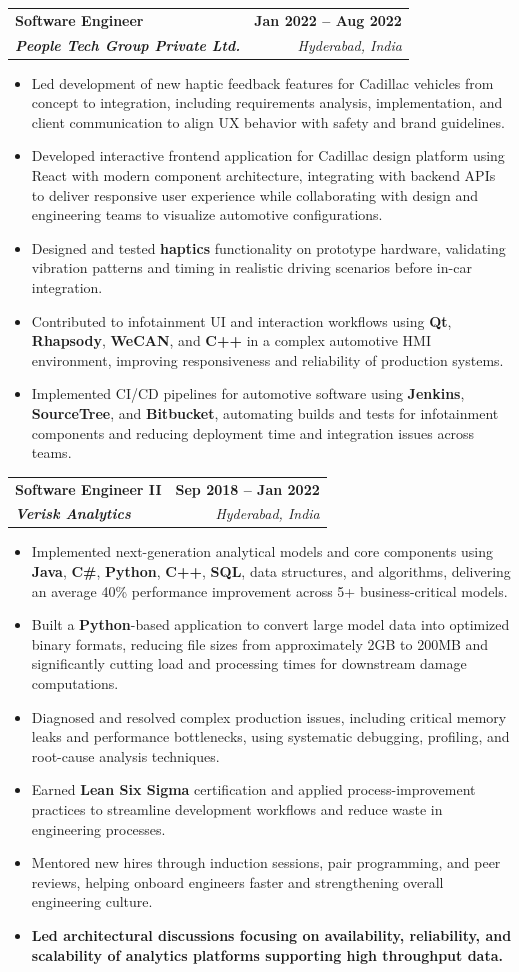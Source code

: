 \documentclass[letterpaper,11pt]{article}
\makeatletter
\newcommand{\resumeItem}[1]{
  \item\small{
    {#1 \vspace{-2pt}}
  }
}
\newcommand{\resumeSubheading}[4]{
  \vspace{-2pt}\item
    \begin{tabular*}{1.0\textwidth}[t]{l@{\extracolsep{\fill}}r}
      \textbf{#1} & \textbf{\small #2} \\
      \textit{\small#3} & \textit{\small #4} \\
    \end{tabular*}\vspace{-7pt}
}
\newcommand{\resumeItemListStart}{\begin{itemize}}
\newcommand{\resumeItemListEnd}{\end{itemize}\vspace{-5pt}}
\makeatother
\begin{document}
    \resumeSubheading
      {\textbf{Software Engineer}}{\textbf{Jan 2022 -- Aug 2022}}
      {\textbf{People Tech Group Private Ltd.}}{Hyderabad, India}
      \resumeItemListStart
        \resumeItem{Led development of new haptic feedback features for Cadillac vehicles from concept to integration, including requirements analysis, implementation, and client communication to align UX behavior with safety and brand guidelines.}
        \resumeItem{Developed interactive frontend application for Cadillac design platform using React with modern component architecture, integrating with backend APIs to deliver responsive user experience while collaborating with design and engineering teams to visualize automotive configurations.}
        \resumeItem{Designed and tested \textbf{haptics} functionality on prototype hardware, validating vibration patterns and timing in realistic driving scenarios before in-car integration.}
        \resumeItem{Contributed to infotainment UI and interaction workflows using \textbf{Qt}, \textbf{Rhapsody}, \textbf{WeCAN}, and \textbf{C++} in a complex automotive HMI environment, improving responsiveness and reliability of production systems.}
        \resumeItem{Implemented CI/CD pipelines for automotive software using \textbf{Jenkins}, \textbf{SourceTree}, and \textbf{Bitbucket}, automating builds and tests for infotainment components and reducing deployment time and integration issues across teams.}
      \resumeItemListEnd

    \resumeSubheading
      {\textbf{Software Engineer II}}{\textbf{Sep 2018 -- Jan 2022}}
      {\textbf{Verisk Analytics}}{Hyderabad, India}
      \resumeItemListStart
        \resumeItem{Implemented next-generation analytical models and core components using \textbf{Java}, \textbf{C\#}, \textbf{Python}, \textbf{C++}, \textbf{SQL}, data structures, and algorithms, delivering an average 40\% performance improvement across 5+ business-critical models.}
        \resumeItem{Built a \textbf{Python}-based application to convert large model data into optimized binary formats, reducing file sizes from approximately 2GB to 200MB and significantly cutting load and processing times for downstream damage computations.}
        \resumeItem{Diagnosed and resolved complex production issues, including critical memory leaks and performance bottlenecks, using systematic debugging, profiling, and root-cause analysis techniques.}
        \resumeItem{Earned \textbf{Lean Six Sigma} certification and applied process-improvement practices to streamline development workflows and reduce waste in engineering processes.}
        \resumeItem{Mentored new hires through induction sessions, pair programming, and peer reviews, helping onboard engineers faster and strengthening overall engineering culture.}
        \resumeItem{\textbf{Led architectural discussions focusing on availability, reliability, and scalability of analytics platforms supporting high throughput data.}}
      \resumeItemListEnd
\end{document}
